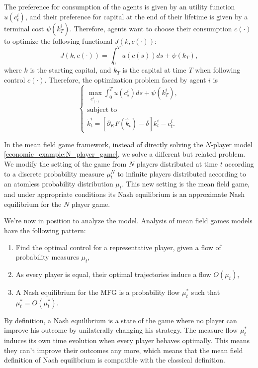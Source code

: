 The preference for consumption of the agents is given by an utility function $u(c_t^i)$, 
and their preference for capital at the end of their lifetime is given by a terminal cost $\psi(k_T^i)$.
Therefore, agents want to choose their consumption $c(\cdot)$ to optimize the following functional $J(k, c(\cdot))$:
\begin{equation}
    J(k, c(\cdot)) = \int_0^T u(c(s)) ds + \psi(k_T),
\end{equation}
where $k$ is the starting capital, and $k_T$ is the capital at time $T$ when following control $c(\cdot)$.
Therefore, the optimization problem faced by agent $i$ is
\begin{equation}\label{economic_example:N_player_game}
    \begin{cases}
        \max_{c^i_{(\cdot)}} \int_0^T u(c^i_s) ds + \psi(k^i_T),\\
        \text{subject to}\\
        \dot k_t^i = \left[ \partial_K F(\hat k_t) - \delta \right] k_t^i - c_t^i.
    \end{cases}
\end{equation}

In the mean field game framework, instead of directly solving the $N$-player model \eqref{economic_example:N_player_game},
we solve a different but related problem. 
We modify the setting of the game from $N$ players distributed at time $t$ according to a discrete probability measure $\mu^N_t$ to infinite players
distributed according to an atomless probability distribution  $\mu_t$.
This new setting is the mean field game, and under appropriate conditions its Nash equilibrium is an approximate Nash equilibrium for the $N$ player game.

We're now in position to analyze the model. Analysis of mean field games models have the following pattern:
\begin{enumerate}
    \item Find the optimal control for a representative player, given a flow of probability measures $\mu_t$,
    \item As every player is equal, their optimal trajectories induce a flow $O(\mu_t)$,
    \item A Nash equilibrium for the MFG is a probability flow $\mu_t^*$ such that $\mu_t^* = O(\mu_t^*)$.
\end{enumerate}
By definition, a Nash equilibrium is a state of the game where no player can improve his outcome by unilaterally changing his strategy.
The measure flow $\mu_t^*$ induces its own time evolution when every player behaves optimally.
This means they can't improve their outcomes any more,
which means that the mean field definition of Nash equilibrium is compatible with the classical definition.
 
